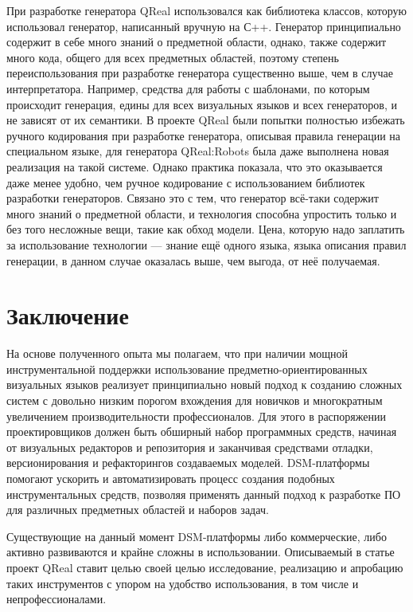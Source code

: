 \documentclass[a4, 12pt]{article}
\begin{document}
При разработке генератора QReal использовался как библиотека классов, которую использовал генератор, написанный вручную на С++. Генератор принципиально содержит в себе много знаний о предметной области, однако, также содержит много кода, общего для всех предметных областей, поэтому степень переиспользования при разработке генератора существенно выше, чем в случае интерпретатора. Например, средства для работы с шаблонами, по которым происходит генерация, едины для всех визуальных языков и всех генераторов, и не зависят от их семантики. В проекте QReal были попытки полностью избежать ручного кодирования при разработке генератора, описывая правила генерации на специальном языке, для генератора QReal:Robots была даже выполнена новая реализация на такой системе. Однако практика показала, что это оказывается даже менее удобно, чем ручное кодирование с использованием библиотек разработки генераторов. Связано это с тем, что генератор всё-таки содержит много знаний о предметной области, и технология способна упростить только и 
без того несложные вещи, такие как обход модели. Цена, которую надо заплатить за использование технологии --- знание ещё одного языка, языка описания правил генерации, в данном случае оказалась выше, чем выгода, от неё получаемая.

\section*{Заключение}

На основе полученного опыта мы полагаем, что при наличии мощной инструментальной поддержки использование предметно-ориентированных визуальных языков реализует принципиально новый подход к созданию сложных систем с довольно низким порогом вхождения для новичков и многократным увеличением производительности профессионалов. Для этого в распоряжении проектировщиков должен быть обширный набор программных средств, начиная от визуальных редакторов и репозитория и заканчивая средствами отладки, версионирования и рефакторингов создаваемых моделей. DSM-платформы помогают ускорить и автоматизировать процесс создания подобных инструментальных средств, позволяя применять данный подход к разработке ПО для различных предметных областей и наборов задач. 

Существующие на данный момент DSM-платформы либо коммерческие, либо активно развиваются и крайне сложны в использовании. Описываемый в статье проект QReal ставит целью своей целью исследование, реализацию и апробацию таких инструментов с упором на удобство использования, в том числе и непрофессионалами. 
\end{document}
